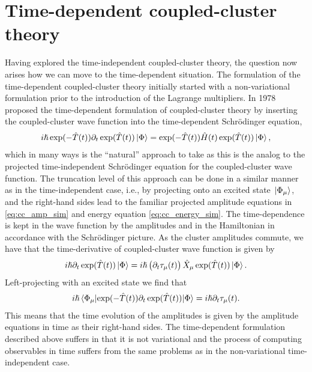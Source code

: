     \section{Time-dependent coupled-cluster theory}
        Having explored the time-independent coupled-cluster theory, the
        question now arises how we can move to the time-dependent situation.
        The formulation of the time-dependent coupled-cluster theory initially
        started with a non-variational formulation prior to the introduction of
        the Lagrange multipliers.
        In 1978 \citeauthor{tdcc-hoodbhoy} \cite{tdcc-hoodbhoy, tdcc-hoodbhoy-2}
        proposed the time-dependent formulation of coupled-cluster theory by
        inserting the coupled-cluster wave function into the time-dependent
        Schrödinger equation,
        \begin{align}
            i\hslash
            \exponential(-\clust(t))
            \partial_t
            \exponential(\clust(t))
            \ket*{\slat}
            = \exponential(-\clust(t))
            \hamil(t)
            \exponential(\clust(t))
            \ket*{\slat},
        \end{align}
        which in many ways is the ``natural'' approach to take as this is the
        analog to the projected time-independent Schrödinger equation for the
        coupled-cluster wave function.
        The truncation level of this approach can be done in a similar manner as
        in the time-independent case, i.e., by projecting onto an excited state
        $\ket*{\Phi_{\mu}}$, and the right-hand sides lead to the familiar
        projected amplitude equations in \autoref{eq:cc_amp_sim} and energy
        equation \autoref{eq:cc_energy_sim}.
        The time-dependence is kept in the wave function by the amplitudes and
        in the Hamiltonian in accordance with the Schrödinger picture.
        As the cluster amplitudes commute, we have that the time-derivative of
        coupled-cluster wave function is given by
        \begin{align}
            i\hslash\partial_t
            \exponential(\clust(t))
            \ket*{\slat}
            = i\hslash \para{
                \partial_t\clustamp_{\mu}(t)
            }
            \hat{X}_{\mu}
            \exponential(\clust(t))
            \ket*{\slat}.
        \end{align}
        Left-projecting with an excited state we find that
        \begin{align}
            i\hslash
            \mel*{\slat_{\mu}}{
                \exponential(-\clust(t))
                \partial_t
                \exponential(\clust(t))
            }{\slat}
            =
            i\hslash
            \partial_t
            \clustamp_{\mu}(t).
            \label{eq:td-clustamp}
        \end{align}
        This means that the time evolution of the amplitudes is given by the
        amplitude equations in time as their right-hand sides.
        The time-dependent formulation described above suffers in that it is not
        variational \cite{tdcc-hoodbhoy, tdcc-hoodbhoy-2, tdcc-huber} and the
        process of computing observables in time suffers from the same problems
        as in the non-variational time-independent case.

